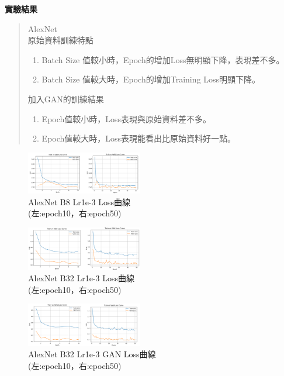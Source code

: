 \begin{flushleft}
    {\fontsize{12}{0} \bf 實驗結果}
\end{flushleft}
%
\begin{abstract}
    AlexNet\\
    原始資料訓練特點
    \begin{enumerate}[1.]
        \item Batch Size 值較小時，Epoch的增加Loss無明顯下降，表現差不多。
        \item Batch Size 值較大時，Epoch的增加Training Loss明顯下降。
    \end{enumerate}
    加入GAN的訓練結果
    \begin{enumerate}[1.]
        \item Epoch值較小時，Loss表現與原始資料差不多。
        \item Epoch值較大時，Loss表現能看出比原始資料好一點。
    \end{enumerate}
\end{abstract}
%
\begin{figure}[htbp]
    \centering
    \includegraphics[width=0.45\textwidth]{./img/AlexNet/b8_lr1e-3_loss.png}
    \caption{AlexNet B8 Lr1e-3 Loss曲線\protect\\(左:epoch10，右:epoch50)}
    \label{fig:AlexNet_b8_lr1e-3_loss_curve}
\end{figure}
\begin{figure}[htbp]
    \centering
    \includegraphics[width=0.45\textwidth]{./img/AlexNet/b32_lr1e-3_loss.png}
    \caption{AlexNet B32 Lr1e-3 Loss曲線\protect\\(左:epoch10，右:epoch50)}
    \label{fig:AlexNet_b32_lr1e-3_loss_curve}
\end{figure}
\begin{figure}[htbp]
    \centering
    \includegraphics[width=0.45\textwidth]{./img/AlexNet/b32_lr1e-3_GAN_loss.png}
    \caption{AlexNet B32 Lr1e-3 GAN Loss曲線\protect\\(左:epoch10，右:epoch50)}
    \label{fig:AlexNet_b32_lr1e-3_GAN_loss_curve}
\end{figure}
